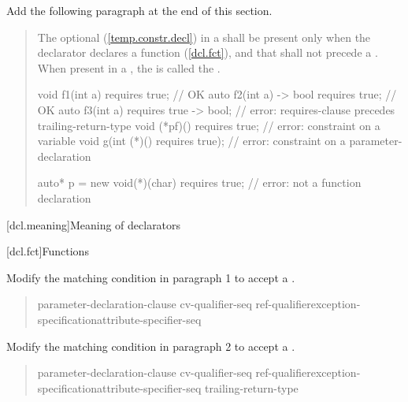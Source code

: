 Add the following paragraph at the end of this section.

\begin{quote}
\begin{addedblock}
\pnum
The optional  (\ref{temp.constr.decl}) in a 
 shall be present only when the declarator declares a 
function (\ref{dcl.fct}), and that  shall not 
precede a . 
% 
When present in a , the  
is called the .
% 
\enterexample
\begin{codeblock}
void f1(int a) requires true;         // OK
auto f2(int a) -> bool requires true; // OK
auto f3(int a) requires true -> bool; // error: requires-clause precedes trailing-return-type
void (*pf)() requires true;           // error: constraint on a variable
void g(int (*)() requires true);      // error: constraint on a parameter-declaration
  
auto* p = new void(*)(char) requires true; // error: not a function declaration
\end{codeblock}
\exitexample
\end{addedblock}
\end{quote}


\setcounter{section}{2}
[dcl.meaning]{Meaning of declarators}


\setcounter{subsection}{4}
[dcl.fct]{Functions}

Modify the matching condition in paragraph 1 to accept a 
.
      
\begin{quote}
\pnum\vspace{-\the\baselineskip} %

\begin{bnf}
 \terminal{(} parameter-declaration-clause \terminal{)} cv-qualifier-seq\opt\br
  \hspace*{\bnfindentinc}ref-qualifier\opt exception-specification\opt attribute-specifier-seq\opt {}
\end{bnf}
\end{quote}

Modify the matching condition in paragraph 2 to accept a 
.

\begin{quote}
\pnum\vspace{-\the\baselineskip} %

\begin{bnf}
 \terminal{(} parameter-declaration-clause \terminal{)} cv-qualifier-seq\opt\br 
  \hspace*{\bnfindentinc}ref-qualifier\opt exception-specification\opt attribute-specifier-seq\opt\br
  \hspace*{\bnfindentinc}trailing-return-type 
\end{bnf}
\end{quote}


